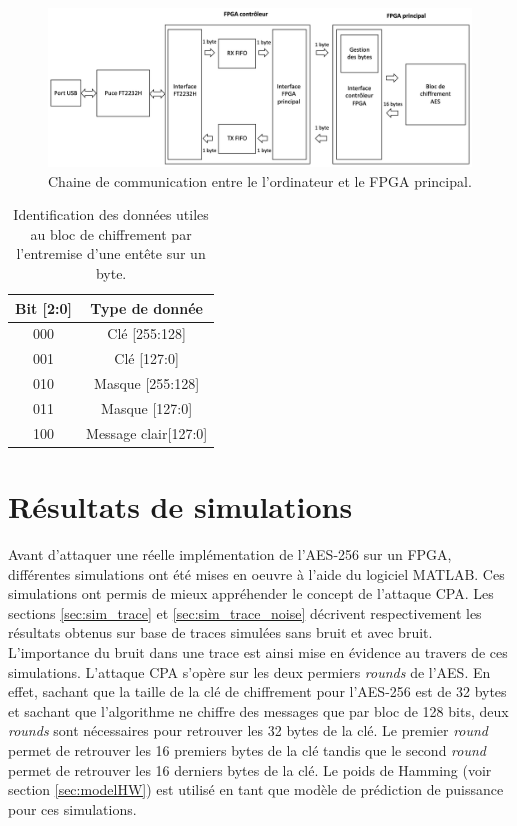 \documentclass[oneside]{book}
\begin{document}
\begin{figure}[htbp]
    \hspace{-1.5cm}
    \includegraphics[scale=0.6]{image/FPGA_Controler}
    \caption{Chaine de communication entre le l'ordinateur et le FPGA principal.}
    \label{fig:FPGA_Controler}
    \vspace{0.25cm}
\end{figure}

\begin{table}[htbp]
	\centering
	\begin{tabular}{|c|c|}
    		\hline
  		  \textbf{Bit [2:0]} &\textbf{ Type de donnée} \\ \hline 
		  000 & Clé [255:128] \\ \hline 
  		  001 & Clé [127:0]  \\ \hline
		  010 & Masque [255:128]  \\ \hline
		  011 & Masque [127:0]  \\ \hline 
 		  100 & Message clair[127:0] \\ \hline
	\end{tabular}
    	\caption{Identification des données utiles au bloc de chiffrement par l'entremise d'une entête sur un byte.}
    	\label{tab:header} 
\end{table}
 
\newpage



\section{Résultats de simulations}
\label{sec:Sim_results_CPA}

Avant d'attaquer une réelle implémentation de l'AES-256 sur un FPGA, différentes simulations ont été mises en oeuvre à l'aide du logiciel MATLAB. Ces simulations ont permis de mieux appréhender le concept de l'attaque CPA. Les sections \ref{sec:sim_trace} et \ref{sec:sim_trace_noise} décrivent respectivement les résultats obtenus sur base de traces simulées sans bruit et avec bruit. L'importance du bruit dans une trace est ainsi mise en évidence au travers de ces simulations. L'attaque CPA s'opère sur les deux permiers \textit{rounds} de l'AES. En effet, sachant que la taille de la clé de chiffrement pour l'AES-256 est de 32 bytes et sachant que l'algorithme ne chiffre des messages que par bloc de 128 bits, deux \textit{rounds} sont nécessaires pour retrouver les 32 bytes de la clé. Le premier \textit{round} permet de retrouver les 16 premiers bytes de la clé tandis que le second \textit{round} permet de retrouver les 16 derniers bytes de la clé. Le poids de Hamming (voir section \ref{sec:modelHW}) est utilisé en tant que modèle de prédiction de puissance pour ces simulations.
\end{document}
